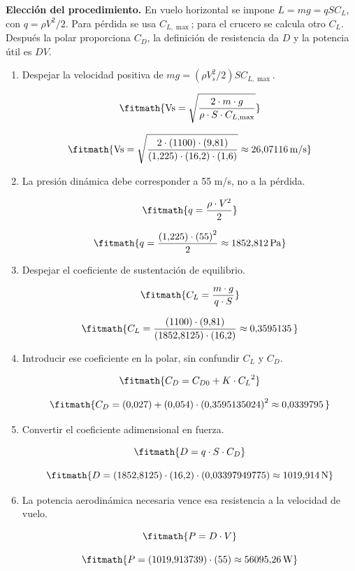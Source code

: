 \noindent\textbf{Elección del procedimiento.} En vuelo horizontal se impone $L=mg=qSC_L$, con $q=\rho V^2/2$. Para pérdida se usa $C_{L,\max}$; para el crucero se calcula otro $C_L$. Después la polar proporciona $C_D$, la definición de resistencia da $D$ y la potencia útil es $DV$.

\begin{enumerate}

\item Despejar la velocidad positiva de $mg=(\rho V_s^2/2)S C_{L,\max}$.

\[\fitmath{\mathrm{Vs}=\sqrt{\frac{2\cdot m\cdot g}{\rho\cdot S\cdot C_{L,\max}}}}\]

\[\fitmath{\mathrm{Vs}=\sqrt{\frac{2\cdot (1100)\cdot (9{,}81)}{(1{,}225)\cdot (16{,}2)\cdot (1{,}6)}}\approx 26{,}07116\,\mathrm{m/s}}\]

\item La presión dinámica debe corresponder a 55 m/s, no a la pérdida.

\[\fitmath{q=\frac{\rho\cdot {V}^{2}}{2}}\]

\[\fitmath{q=\frac{(1{,}225)\cdot {(55)}^{2}}{2}\approx 1852{,}812\,\mathrm{Pa}}\]

\item Despejar el coeficiente de sustentación de equilibrio.

\[\fitmath{C_L=\frac{m\cdot g}{q\cdot S}}\]

\[\fitmath{C_L=\frac{(1100)\cdot (9{,}81)}{(1852{,}8125)\cdot (16{,}2)}\approx 0{,}3595135\,}\]

\item Introducir ese coeficiente en la polar, sin confundir $C_L$ y $C_D$.

\[\fitmath{C_D=C_{D0}+K\cdot {C_L}^{2}}\]

\[\fitmath{C_D=(0{,}027)+(0{,}054)\cdot {(0{,}3595135024)}^{2}\approx 0{,}0339795\,}\]

\item Convertir el coeficiente adimensional en fuerza.

\[\fitmath{D=q\cdot S\cdot C_D}\]

\[\fitmath{D=(1852{,}8125)\cdot (16{,}2)\cdot (0{,}03397949775)\approx 1019{,}914\,\mathrm{N}}\]

\item La potencia aerodinámica necesaria vence esa resistencia a la velocidad de vuelo.

\[\fitmath{P=D\cdot V}\]

\[\fitmath{P=(1019{,}913739)\cdot (55)\approx 56095{,}26\,\mathrm{W}}\]

\end{enumerate}
